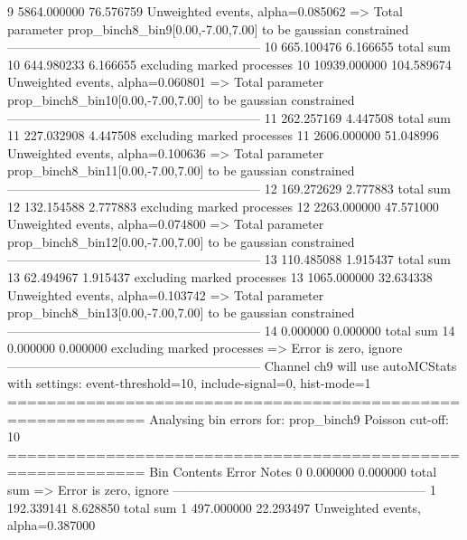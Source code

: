 9          5864.000000     76.576759       Unweighted events, alpha=0.085062
  => Total parameter prop_binch8_bin9[0.00,-7.00,7.00] to be gaussian constrained
------------------------------------------------------------
10         665.100476      6.166655        total sum                     
10         644.980233      6.166655        excluding marked processes    
10         10939.000000    104.589674      Unweighted events, alpha=0.060801
  => Total parameter prop_binch8_bin10[0.00,-7.00,7.00] to be gaussian constrained
------------------------------------------------------------
11         262.257169      4.447508        total sum                     
11         227.032908      4.447508        excluding marked processes    
11         2606.000000     51.048996       Unweighted events, alpha=0.100636
  => Total parameter prop_binch8_bin11[0.00,-7.00,7.00] to be gaussian constrained
------------------------------------------------------------
12         169.272629      2.777883        total sum                     
12         132.154588      2.777883        excluding marked processes    
12         2263.000000     47.571000       Unweighted events, alpha=0.074800
  => Total parameter prop_binch8_bin12[0.00,-7.00,7.00] to be gaussian constrained
------------------------------------------------------------
13         110.485088      1.915437        total sum                     
13         62.494967       1.915437        excluding marked processes    
13         1065.000000     32.634338       Unweighted events, alpha=0.103742
  => Total parameter prop_binch8_bin13[0.00,-7.00,7.00] to be gaussian constrained
------------------------------------------------------------
14         0.000000        0.000000        total sum                     
14         0.000000        0.000000        excluding marked processes    
  => Error is zero, ignore      
------------------------------------------------------------
Channel ch9 will use autoMCStats with settings: event-threshold=10, include-signal=0, hist-mode=1
============================================================
Analysing bin errors for: prop_binch9
Poisson cut-off: 10
============================================================
Bin        Contents        Error           Notes                         
0          0.000000        0.000000        total sum                     
  => Error is zero, ignore      
------------------------------------------------------------
1          192.339141      8.628850        total sum                     
1          497.000000      22.293497       Unweighted events, alpha=0.387000
